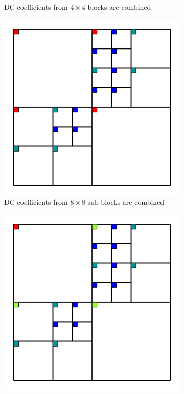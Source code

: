 \documentclass[english,conference,10pt]{IEEEtran}
\begin{document}
\begin{figure}
\begin{subfigure}[t]{0.49\columnwidth}
		\caption{DC coefficients from $4\times 4$ blocks are combined}
	\end{subfigure}
	\begin{subfigure}[t]{0.49\columnwidth}
		\includegraphics[width=\columnwidth]{block32_L2}
		\caption{DC coefficients from $8\times 8$ sub-blocks are combined}
	\end{subfigure}
	\begin{subfigure}[t]{0.49\columnwidth}
		\includegraphics[width=\columnwidth]{block32_L3}

\end{subfigure}
\end{figure}
\end{document}
